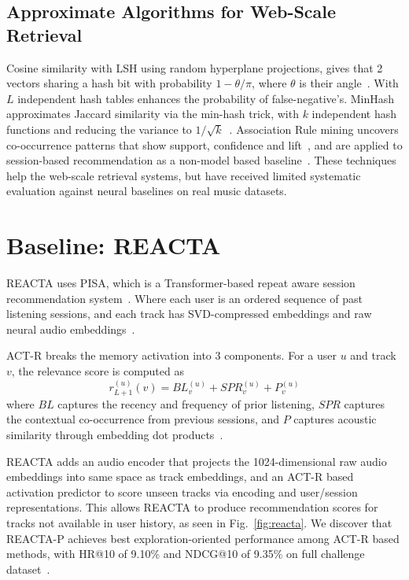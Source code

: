 \documentclass[conference]{IEEEtran}
\begin{document}
\subsection{Approximate Algorithms for Web-Scale Retrieval}
Cosine similarity with LSH using random hyperplane projections, gives that 2
vectors sharing a hash bit with probability $1 - \theta/\pi$, where $\theta$
is their angle~\cite{datar2004}. With $L$ independent hash tables enhances the
probability of false-negative's. MinHash approximates Jaccard similarity via
the min-hash trick, with $k$ independent hash functions and reducing the
variance to $1/\sqrt{k}$~\cite{broder1997}. Association Rule mining uncovers
co-occurrence patterns that show support, confidence and lift~\cite{agrawal1994},
and are applied to session-based recommendation as a non-model based
baseline~\cite{quadrana2018}. These techniques help the web-scale retrieval
systems, but have received limited systematic evaluation against neural
baselines on real music datasets.

\section{Baseline: REACTA}

REACTA uses PISA, which is a Transformer-based repeat aware session
recommendation system~\cite{tran2024pisa,tran2025reacta}. Where each user is
an ordered sequence of past listening sessions, and each track has
SVD-compressed embeddings and raw neural audio embeddings~\cite{tran2025reacta}.

ACT-R breaks the memory activation into 3 components. For a user $u$ and
track $v$, the relevance score is computed as
\begin{equation}
r^{(u)}_{L+1}(v) = BL^{(u)}_{v} + SPR^{(u)}_{v} + P^{(u)}_{v}
\end{equation}
where $BL$ captures the recency and frequency of prior listening, $SPR$
captures the contextual co-occurrence from previous sessions, and $P$ captures
acoustic similarity through embedding dot products~\cite{tran2025reacta}.

REACTA adds an audio encoder that projects the 1024-dimensional raw audio
embeddings into same space as track embeddings, and an ACT-R based activation
predictor to score unseen tracks via encoding and user/session representations.
This allows REACTA to produce recommendation scores for tracks not available
in user history, as seen in Fig.~\ref{fig:reacta}. We discover that REACTA-P
achieves best exploration-oriented performance among ACT-R based methods, with
HR@10 of 9.10\% and NDCG@10 of 9.35\% on full challenge
dataset~\cite{tran2025reacta}.
\end{document}
